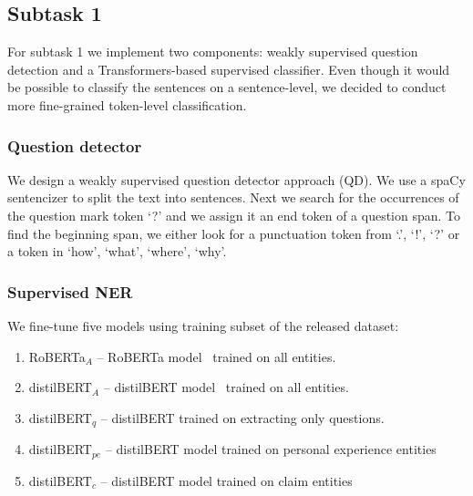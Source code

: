 \documentclass[11pt]{article}
\begin{document}
\subsection{Subtask 1} \label{sec:system1}
\label{subsec:syst_task1}
%
For subtask 1 we implement two components: weakly supervised question detection and a Transformers-based supervised classifier.
Even though it would be possible to classify the sentences on a sentence-level, we decided to conduct more fine-grained token-level classification.

\subsubsection*{Question detector}


We design a weakly supervised question detector approach (QD).
We use a spaCy sentencizer to split the text into sentences.
Next we search for the occurrences of the question mark token `?' and we assign it an end token of a question span.
To find the beginning span, we either look for a punctuation token from `.’, `!’, `?’ or a token in `how’, ‘what’, ‘where’, `why’.



\subsubsection*{Supervised NER}


We fine-tune five models using training subset of the released dataset:

\begin{enumerate}
\item RoBERTa$_A$ -- RoBERTa model~\cite{Liu2019RoBERTaAR} trained on all entities. %
\item distilBERT$_A$ -- distilBERT model~\cite{Sanh2019DistilBERTAD} trained on all entities.  %
\item  distilBERT$_q$ --  distilBERT trained on extracting only questions. %
\item distilBERT$_{pe}$ -- distilBERT model trained on personal experience entities %
\item distilBERT$_c$ -- distilBERT model trained on claim entities %
\end{enumerate}
\end{document}
